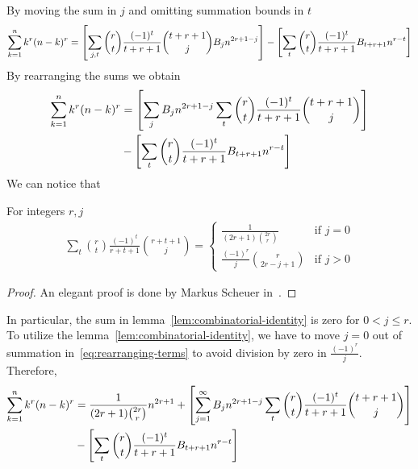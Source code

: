 By moving the sum in $j$ and omitting summation bounds in $t$
\begin{align*}
    \sum_{k=1}^{n} k^{r} (n-k)^{r}
    = \left[ \sum_{j, t} \binom{r}{t} \frac{(-1)^t}{t+r+1} \binom{t+r+1}{j} {B}\sb{j} n^{2r+1-j}  \right]
    - \left[ \sum_{t} \binom{r}{t} \frac{(-1)^t}{t+r+1} {B}\sb{t+r+1} n^{r-t} \right]
\end{align*}
By rearranging the sums we obtain
\begin{align}
    \label{eq:rearranging-terms}
    \sum_{k=1}^{n} k^{r} (n-k)^{r}
    &= \left[ \sum_{j} {B}\sb{j} n^{2r+1-j} \sum_{t} \binom{r}{t} \frac{(-1)^t}{t+r+1} \binom{t+r+1}{j}  \right] \\
    &- \left[ \sum_{t} \binom{r}{t} \frac{(-1)^t}{t+r+1} {B}\sb{t+r+1} n^{r-t} \right] \nonumber
\end{align}
We can notice that
\begin{lemma}
    \label{lem:combinatorial-identity}
    For integers $r, j$
    \begin{align*}
        \sum_{t} \binom{r}{t} \frac{(-1)^t}{r+t+1} \binom{r+t+1}{j}
        =\begin{cases}
             \frac{1}{(2r+1) \binom{2r}r} & \text{if } j=0\\
             \frac{(-1)^r}{j} \binom{r}{2r-j+1} & \text{if } j>0
        \end{cases}
    \end{align*}
    \begin{proof}
        An elegant proof is done by Markus Scheuer in~\cite{scheuer2023mathstackexchange}.
    \end{proof}
\end{lemma}
In particular, the sum in lemma~\eqref{lem:combinatorial-identity} is zero for $0< j \leq r$.
To utilize the lemma~\eqref{lem:combinatorial-identity}, we have to move $j=0$ out of summation
in~\eqref{eq:rearranging-terms} to avoid division by zero in $\frac{(-1)^r}{j}$.
Therefore,
\begin{equation*}
    \begin{split}
        \sum_{k=1}^{n} k^{r} (n-k)^{r}
        &= \frac{1}{(2r+1) \binom{2r}r} n^{2r+1}
        + \left[ \sum_{j = 1}^{\infty} {B}\sb{j} n^{2r+1-j} \sum_{t} \binom{r}{t} \frac{(-1)^t}{t+r+1} \binom{t+r+1}{j} \right] \\
        &- \left[ \sum_{t} \binom{r}{t} \frac{(-1)^t}{t+r+1} {B}\sb{t+r+1} n^{r-t} \right]
    \end{split}
\end{equation*}

